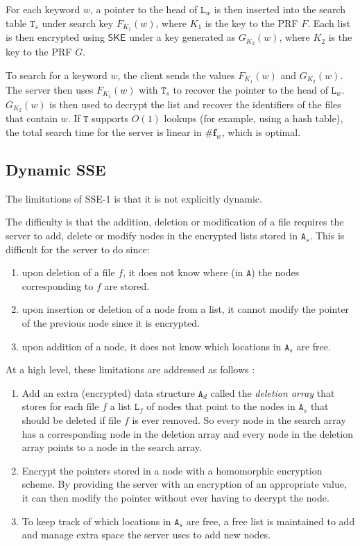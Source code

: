 \documentclass[12pt,a4paper]{article}
\theoremstyle{definition}
\begin{document}
For each keyword \(w\), a pointer to the head of \(\mathtt{L}_w\) is then
inserted into the search table \(\mathtt{T}_s\) under search key
\(F_{K_1}(w)\), where \(K_1\) is the key to the PRF \(F\). Each list
is then encrypted using \(\mathsf{SKE}\) under a key generated
as \(G_{K_2}(w)\), where \(K_2\) is the key to the PRF \(G\).

To search for a keyword \(w\), the client sends the values \(F_{K_1}(w)\) and
\(G_{K_2}(w)\). The server then uses \(F_{K_1}(w)\) with \(\mathtt{T}_s\)
to recover the pointer to the head of \(\mathtt{L}_w\).
\(G_{K_2}(w)\) is then used to decrypt the list and recover the identifiers
of the files that contain \(w\). If \(\mathtt{T}\) supports
\(O(1)\) lookups (for example, using a hash table),
the total search time for the server is linear in
\(\#\mathbf{f}_w\), which is optimal.
\clearpage

\subsection{Dynamic SSE}

The limitations of SSE-1 is that it is not explicitly dynamic.

The difficulty is that the addition, deletion or modification of a
file requires the server to add, delete or modify nodes in the
encrypted lists stored in \(\mathtt{A}_s\).
This is difficult for the server to do since:

\begin{enumerate}
\item upon deletion of a file \(f\), it does not know where
	(in \(\mathtt{A}\)) the nodes corresponding to \(f\) are stored.
\item upon insertion or deletion of a node from a list, it cannot
	modify the pointer of the previous node since it is encrypted.
\item upon addition of a node, it does not know which locations in
	\(\mathtt{A}_s\) are free.
\end{enumerate}

At a high level, these limitations are addressed as follows \cite{Kamara}:


\begin{enumerate}
\item Add an extra (encrypted) data structure
	\(\mathtt{A}_d\) called the \emph{deletion array} that
	stores for each file \(f\) a list \(\mathtt{L}_f\)
	of nodes that point to the nodes in \(\mathtt{A}_s\) that should be
	deleted if file \(f\) is ever removed. So every node in the
	search array has a corresponding node in the deletion array and
	every node in the deletion array points to a node in the search array.
\item Encrypt the pointers stored in a node with
	a homomorphic encryption scheme. By providing the server with an
	encryption of an appropriate value, it can then modify the pointer
	without ever having to decrypt the node.
\item To keep track of which locations in \(\mathtt{A}_s\)
	are free, a free list is maintained to add and manage extra space
	the server uses to add new nodes.
\end{enumerate}
\clearpage
\end{document}
